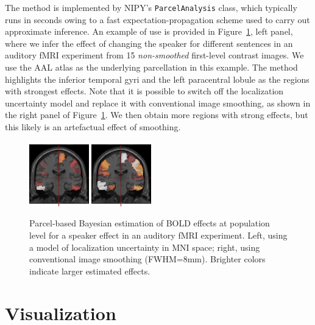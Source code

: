 \documentclass{bioinfo}
\begin{document}
The method is implemented by NIPY's {\tt ParcelAnalysis} class, which
typically runs in seconds owing to a fast expectation-propagation
scheme \citep{minka:techrep:05} used to carry out approximate
inference. An example of use is provided in
Figure~\ref{fig:parcel_group}, left panel, where we infer the effect
of changing the speaker for different sentences in an auditory fMRI
experiment from 15 {\em non-smoothed} first-level contrast images. We
use the AAL atlas \citep{tzourio:ni:02} as the underlying parcellation
in this example. The method highlights the inferior temporal gyri and
the left paracentral lobule as the regions with strongest
effects. Note that it is possible to switch off the localization
uncertainty model and replace it with conventional image smoothing, as
shown in the right panel of Figure~\ref{fig:parcel_group}. We then
obtain more regions with strong effects, but this likely is an
artefactual effect of smoothing.

\begin{figure}
\begin{center}
  \includegraphics[width=0.23\textwidth]{parcel_group_analysis.png}
  \includegraphics[width=0.23\textwidth]{parcel_group_analysis_naive.png}
\end{center}
\caption{Parcel-based Bayesian estimation of BOLD effects at
  population level for a speaker effect in an auditory fMRI
  experiment. Left, using a model of localization uncertainty in MNI
  space; right, using conventional image smoothing
  (FWHM=8mm). Brighter colors indicate larger estimated effects.}
\label{fig:parcel_group}
\end{figure}



\section{Visualization}
\end{document}
